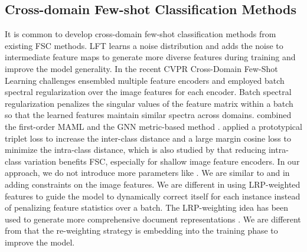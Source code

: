 \documentclass[a4paper,conference]{IEEEtran}
\begin{document}
\subsection{Cross-domain Few-shot Classification Methods}
It is common to develop cross-domain few-shot classification methods from existing FSC methods.
LFT\cite{FeaturewiseTranslayer:tseng2020cross} learns a noise distribution and adds the noise to intermediate feature maps to generate more diverse features during training and improve the model generality. In the recent CVPR Cross-Domain Few-Shot Learning challenges \cite{CDFSLCVPR:guo2019new, BSR:liu2020feature} ensembled multiple feature encoders and employed batch spectral regularization over the image features for each encoder. Batch spectral regularization penalizes the singular values of the feature matrix within a batch so that the learned features maintain similar spectra across domains. \cite{MetaFT:cai2020cross} combined the first-order MAML\cite{MAML:finn2017model} and the GNN metric-based method \cite{FEWGNN:garcia2018fewshot}.  
\cite{LMM:yeh2020large} applied a prototypical triplet loss to increase the inter-class distance and a large margin cosine loss to minimize the intra-class distance, which is also studied by \cite{ACLOSERLOOK:chen2018a} that reducing intra-class variation benefits FSC, especially for shallow image feature encoders. 
In our approach, we do not introduce more parameters like \cite{FeaturewiseTranslayer:tseng2020cross}. We are similar to \cite{BSR:liu2020feature} and \cite{LMM:yeh2020large} in adding constraints on the image features. We are different in using LRP-weighted features to guide the model to dynamically correct itself for each instance instead of penalizing feature statistics over a batch. The LRP-weighting idea has been used to generate more comprehensive document representations \cite{LRPreweight:arras2017relevant}. We are different from \cite{LRPreweight:arras2017relevant} that the re-weighting strategy is embedding into the training phase to improve the model.
\end{document}

